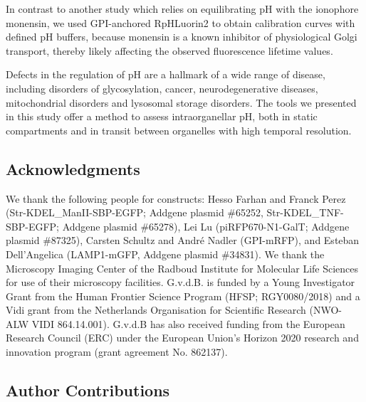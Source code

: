 In contrast to another study which relies on equilibrating pH with the ionophore monensin\cite{ma_live-cell_2017}, we used GPI-anchored RpHLuorin2 to obtain calibration curves with defined pH buffers, because monensin is a known inhibitor of physiological Golgi transport, thereby likely affecting the observed fluorescence lifetime values\cite{eisenberg-lerner_golgi_2020,baumann_golgi_2018,oku_novel_2011,taniguchi_tfe3_2015,reiling_creb3arf4_2013,sbodio_golgi_2018,taniguchi_mlx_2016}.

Defects in the regulation of pH are a hallmark of a wide range of disease, including disorders of glycosylation\cite{linders_sugary_2020,kornak_impaired_2008,jansen_atp6ap1_2016,rujano_mutations_2017,cannata_serio_mutations_2020,jansen_ccdc115_2016,jansen_tmem199_2016}, cancer\cite{stransky_function_2016}, neurodegenerative diseases\cite{wolfe_autophagy_2013,koh_lysosomal_2019,dehay_loss_2012,jinn_tmem175_2017}, mitochondrial disorders\cite{fernandez-mosquera_mitochondrial_2019} and lysosomal storage disorders\cite{bagh_misrouting_2017}. The tools we presented in this study offer a method to assess intraorganellar pH, both in static compartments and in transit between organelles with high temporal resolution.

\subsection{Acknowledgments}

We thank the following people for constructs: Hesso Farhan and Franck Perez (Str-KDEL\_ManII-SBP-EGFP; Addgene plasmid \#65252, Str-KDEL\_TNF-SBP-EGFP; Addgene plasmid \#65278), Lei Lu (piRFP670-N1-GalT; Addgene plasmid \#87325), Carsten Schultz and André Nadler (GPI-mRFP), and Esteban Dell’Angelica (LAMP1-mGFP, Addgene plasmid \#34831). We thank the Microscopy Imaging Center of the Radboud Institute for Molecular Life Sciences for use of their microscopy facilities. G.v.d.B. is funded by a Young Investigator Grant from the Human Frontier Science Program (HFSP; RGY0080/2018) and a Vidi grant from the Netherlands Organisation for Scientific Research (NWO-ALW VIDI 864.14.001). G.v.d.B has also received funding from the European Research Council (ERC) under the European Union’s Horizon 2020 research and innovation program (grant agreement No. 862137).

\subsection{Author Contributions}

